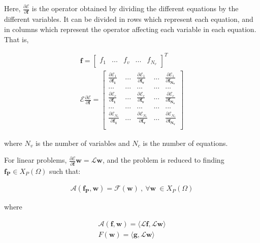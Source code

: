 \documentclass{CFD2011}
\begin{document}
Here, $\frac{\partial\mathcal{E}}{\partial \mathbf{f}}$ is the operator obtained by dividing the different equations by the different variables. It can be divided in rows which represent each equation, and in columns which represent the operator affecting each variable in each equation. That is,

\begin{eqnarray}
\mathbf{f}=\left[ \begin{array}{ccccc} f_1 & ... & f_{v} & ... & f_{N_v} \end{array} \right]^T \nonumber\\
 {\mathcal{E}} {\frac{\partial\mathcal{E}}{\partial \mathbf{f}}}=\left[ \begin{array}{ccccc}
 {\frac{\partial\mathcal{E}_{1}}{\partial \mathbf{f_1}}} & ... &  {\frac{\partial\mathcal{E}_{1}}{\partial \mathbf{f_v}}} & ... &  {\frac{\partial\mathcal{E}_{1}}{\partial \mathbf{f_{N_v}}}} \\
... & ... & ... & ... & ... \\
 {\frac{\partial\mathcal{E}_{c}}{\partial \mathbf{f_{1}}}} & ... &  {\frac{\partial\mathcal{E}_{c}}{\partial \mathbf{f_{v}}}} & ... &  {\frac{\partial\mathcal{E}_{c}}{\partial \mathbf{f_{N_v}}}} \\
... & ... & ... & ... & ... \\
 {\frac{\partial\mathcal{E}_{N_c}}{\partial \mathbf{f_{1}}}} & ... &  {\frac{\partial\mathcal{E}_{N_c}}{\partial \mathbf{f_{v}}}} & ... &  {\frac{\partial\mathcal{E}_{N_c}}{\partial \mathbf{f_{N_v}}}} \\
\end{array} \right] 
\label{eq:eqOp}
\end{eqnarray}

\noindent where $N_v$ is the number of variables and $N_c$ is the number of equations.

For linear problems, $\frac{\partial\mathcal{E}}{\partial \mathbf{f}}\mathbf{w}=\mathcal{L}\mathbf{w}$, and the problem is reduced to finding $\mathbf{f_P} \in X_P(\Omega)$ such that:


\begin{eqnarray}
\mathcal{A}(\mathbf{f_P},\mathbf{w})=\mathcal{F}(\mathbf{w}) \ ,\ \forall \mathbf{w} \ \in X_P(\Omega)
\label{eq:equivalent}
\end{eqnarray}

\noindent where

\begin{eqnarray}
\mathcal{A}(\mathbf{f},\mathbf{w})= \langle \mathcal{L}\mathbf{f},\mathcal{L}\mathbf{w} \rangle \nonumber \\ 
F(\mathbf{w})= \langle \mathbf{g},\mathcal{L}\mathbf{w} \rangle 
\label{eq:equivLinear}
\end{eqnarray}
\end{document}
